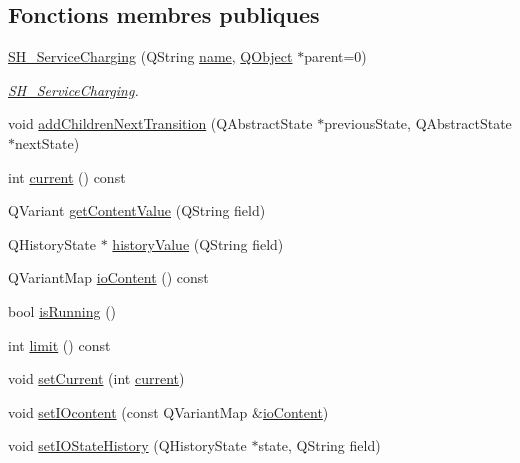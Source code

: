 \subsection*{Fonctions membres publiques}
\begin{DoxyCompactItemize}
\item 
\hyperlink{classSH__ServiceCharging_afa5273d046049b1c2b020a6a19a8290b}{S\-H\-\_\-\-Service\-Charging} (Q\-String \hyperlink{classSH__NamedObject_a9f686c6f2a5bcc08ad03d0cee0151f0f}{name}, \hyperlink{classQObject}{Q\-Object} $\ast$parent=0)
\begin{DoxyCompactList}\small\item\em \hyperlink{classSH__ServiceCharging}{S\-H\-\_\-\-Service\-Charging}. \end{DoxyCompactList}\item 
void \hyperlink{classSH__LoopingInOutStateMachine_abfae9f47019379f270496de46845c729}{add\-Children\-Next\-Transition} (Q\-Abstract\-State $\ast$previous\-State, Q\-Abstract\-State $\ast$next\-State)
\item 
int \hyperlink{classSH__LoopingInOutStateMachine_afce58401195a4941b1939c46f1caa23b}{current} () const 
\item 
Q\-Variant \hyperlink{classSH__InOutStateMachine_aa1a3bd3c0ea8a59b9bc916dc718eb9ca}{get\-Content\-Value} (Q\-String field)
\item 
Q\-History\-State $\ast$ \hyperlink{classSH__InOutStateMachine_af71bfdb3b59b7bf2763588b513b4205f}{history\-Value} (Q\-String field)
\item 
Q\-Variant\-Map \hyperlink{classSH__InOutStateMachine_aaca105fbd5f5cc3bac115389ad3694c5}{io\-Content} () const 
\item 
bool \hyperlink{classSH__GenericStateMachine_a7e650d582a4c1b8cf2869fb5873b36a9}{is\-Running} ()
\item 
int \hyperlink{classSH__LoopingInOutStateMachine_aa82afb8de3acbd0953bdf468f697d777}{limit} () const 
\item 
void \hyperlink{classSH__LoopingInOutStateMachine_aed2f3a75029856cbf28cae78040e17c1}{set\-Current} (int \hyperlink{classSH__LoopingInOutStateMachine_afce58401195a4941b1939c46f1caa23b}{current})
\item 
void \hyperlink{classSH__InOutStateMachine_a8271a7ec7d5f6502449dd3b4da5f4155}{set\-I\-Ocontent} (const Q\-Variant\-Map \&\hyperlink{classSH__InOutStateMachine_aaca105fbd5f5cc3bac115389ad3694c5}{io\-Content})
\item 
void \hyperlink{classSH__InOutStateMachine_acbcce2c4300af1634d928b30e5e9be1c}{set\-I\-O\-State\-History} (Q\-History\-State $\ast$state, Q\-String field)

\end{DoxyCompactItemize}

